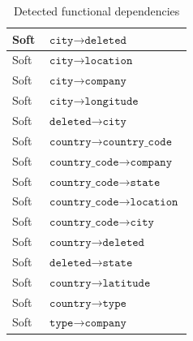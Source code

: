 \documentclass{article}
\begin{document}
\begin{table}[ht]
\begin{tabular}{|p{}|p{}|}
                Soft & $\texttt{city} \rightarrow \texttt{deleted}$ \\ 
                \hline
                Soft & $\texttt{city} \rightarrow \texttt{location}$ \\ 
                \hline
                Soft & $\texttt{city} \rightarrow \texttt{company}$ \\ 
                \hline
                Soft & $\texttt{city} \rightarrow \texttt{longitude}$ \\ 
                \hline
                Soft & $\texttt{deleted} \rightarrow \texttt{city}$ \\ 
                \hline
                Soft & $\texttt{country} \rightarrow \texttt{country\_code}$ \\ 
                \hline
                Soft & $\texttt{country\_code} \rightarrow \texttt{company}$ \\ 
                \hline
                Soft & $\texttt{country\_code} \rightarrow \texttt{state}$ \\ 
                \hline
                Soft & $\texttt{country\_code} \rightarrow \texttt{location}$ \\ 
                \hline
                Soft & $\texttt{country\_code} \rightarrow \texttt{city}$ \\ 
                \hline
                Soft & $\texttt{country} \rightarrow \texttt{deleted}$ \\ 
                \hline
                Soft & $\texttt{deleted} \rightarrow \texttt{state}$ \\ 
                \hline
                Soft & $\texttt{country} \rightarrow \texttt{latitude}$ \\ 
                \hline
                Soft & $\texttt{country} \rightarrow \texttt{type}$ \\ 
                \hline
                Soft & $\texttt{type} \rightarrow \texttt{company}$ \\ 
                \hline
                

                
                
            \end{tabular}
            \caption{Detected functional dependencies}
            \label{tab:detected-fds}
        \end{table}
    
\end{document}

